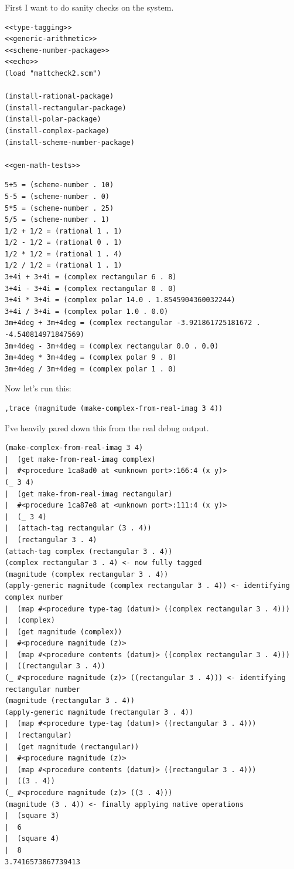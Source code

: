 \documentclass[final,fleqn,titlepage,twoside]{article}
\begin{document}
First I want to do sanity checks on the system.

\begin{verbatim}
<<type-tagging>>
<<generic-arithmetic>>
<<scheme-number-package>>
<<echo>>
(load "mattcheck2.scm")

(install-rational-package)
(install-rectangular-package)
(install-polar-package)
(install-complex-package)
(install-scheme-number-package)

<<gen-math-tests>>
\end{verbatim}

\begin{verbatim}
5+5 = (scheme-number . 10) 
5-5 = (scheme-number . 0) 
5*5 = (scheme-number . 25) 
5/5 = (scheme-number . 1) 
1/2 + 1/2 = (rational 1 . 1) 
1/2 - 1/2 = (rational 0 . 1) 
1/2 * 1/2 = (rational 1 . 4) 
1/2 / 1/2 = (rational 1 . 1) 
3+4i + 3+4i = (complex rectangular 6 . 8) 
3+4i - 3+4i = (complex rectangular 0 . 0) 
3+4i * 3+4i = (complex polar 14.0 . 1.8545904360032244) 
3+4i / 3+4i = (complex polar 1.0 . 0.0) 
3m+4deg + 3m+4deg = (complex rectangular -3.921861725181672 . -4.540814971847569) 
3m+4deg - 3m+4deg = (complex rectangular 0.0 . 0.0) 
3m+4deg * 3m+4deg = (complex polar 9 . 8) 
3m+4deg / 3m+4deg = (complex polar 1 . 0) 
\end{verbatim}

Now let's run this:
\begin{verbatim}
,trace (magnitude (make-complex-from-real-imag 3 4))
\end{verbatim}

I've heavily pared down this from the real debug output.

\begin{verbatim}
(make-complex-from-real-imag 3 4)
|  (get make-from-real-imag complex)
|  #<procedure 1ca8ad0 at <unknown port>:166:4 (x y)>
(_ 3 4)
|  (get make-from-real-imag rectangular)
|  #<procedure 1ca87e8 at <unknown port>:111:4 (x y)>
|  (_ 3 4)
|  (attach-tag rectangular (3 . 4))
|  (rectangular 3 . 4)
(attach-tag complex (rectangular 3 . 4))
(complex rectangular 3 . 4) <- now fully tagged
(magnitude (complex rectangular 3 . 4))
(apply-generic magnitude (complex rectangular 3 . 4)) <- identifying complex number
|  (map #<procedure type-tag (datum)> ((complex rectangular 3 . 4)))
|  (complex)
|  (get magnitude (complex))
|  #<procedure magnitude (z)>
|  (map #<procedure contents (datum)> ((complex rectangular 3 . 4)))
|  ((rectangular 3 . 4))
(_ #<procedure magnitude (z)> ((rectangular 3 . 4))) <- identifying rectangular number
(magnitude (rectangular 3 . 4))
(apply-generic magnitude (rectangular 3 . 4))
|  (map #<procedure type-tag (datum)> ((rectangular 3 . 4)))
|  (rectangular)
|  (get magnitude (rectangular))
|  #<procedure magnitude (z)>
|  (map #<procedure contents (datum)> ((rectangular 3 . 4)))
|  ((3 . 4))
(_ #<procedure magnitude (z)> ((3 . 4)))
(magnitude (3 . 4)) <- finally applying native operations
|  (square 3)
|  6
|  (square 4)
|  8
3.7416573867739413
\end{verbatim}
\end{document}
